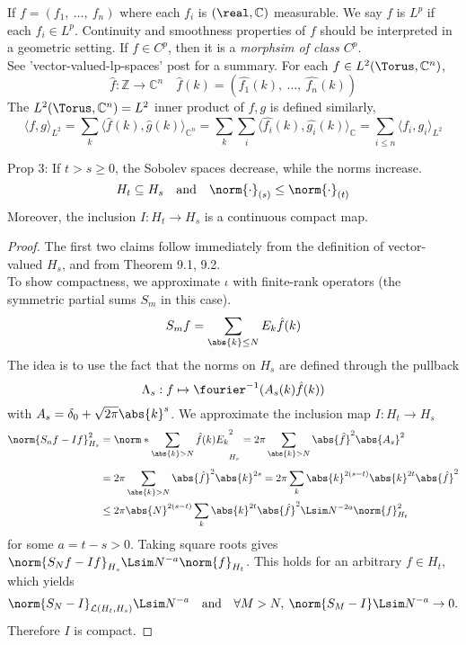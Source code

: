 \documentclass[../main-v2-manifolds.tex]{subfiles}
\begin{document}
If $f = (f_1,\: \ldots, \: f_n)$ where each $f_i$ is $(\real,\mathbb{C})$ measurable. We say $f$ is $L^p$ if each $f_i\in L^p$. Continuity and smoothness properties of $f$ should be interpreted in a geometric setting. If $f\in C^p$, then it is a \emph{morphsim of class $C^p$}.\\
See 'vector-valued-lp-spaces' post for a summary.
For each $f\in L^2(\Torus, \mathbb{C}^n)$, 
\[
\hat{f}:\mathbb{Z}\to\mathbb{C}^n\quad \hat{f}(k) = (\hat{f_1}(k),\:\ldots,\:\hat{f_n}(k))
\]
The $L^2(\Torus,\mathbb{C}^n)=L^2$ inner product of $f,g$ is defined similarly,
\[
\langle f,g\rangle_{L^2} = \sum_k \langle \hat{f}(k),\hat{g}(k)\rangle_{\mathbb{C}^n} =\sum_k\sum_i\langle\hat{f_i}(k),\hat{g_i} (k)\rangle_{\mathbb{C}} =\sum_{i\leq n}\langle f_i,g_i\rangle_{L^2}
\]
\begin{wts}
Prop 3: If $t>s\geq 0$, the Sobolev spaces decrease, while the norms increase.
\[
H_t\subseteq H_s\quad\text{and}\quad \norm{\cdot}_{(s)}\leq\norm{\cdot}_{(t)}
\]
Moreover, the inclusion $I: H_t\to H_s$ is a continuous compact map.
\end{wts}
\begin{proof}
The first two claims follow immediately from the definition of vector-valued $H_s$, and from Theorem 9.1, 9.2.\\

To show compactness, we approximate $\iota$ with finite-rank operators (the symmetric partial sums $S_m$ in this case).
\[
S_m f = \sum_{\abs{k} \leq N} E_k\hat{f}(k)
\]
The idea is to use the fact that the norms on $H_s$ are defined through the pullback
\[
\Lambda_s: f\mapsto \fourier^{-1}(A_s(k)\hat{f}(k))
\]
with $A_s = \delta_0 + \sqrt{2\pi}\abs{k}^{s}$. We approximate the inclusion map $I: H_t\to H_s$
\begin{align*}
\norm{S_n f - If}_{H_s}^{2} &= \norm*{\sum_{\abs{k} > N}\hat{f}(k)E_k }_{H_s}^{2}=2\pi\sum_{{\abs{k}> N}}\abs{\hat{f}}^2\abs{A_s}^2\\[1ex]
&=2\pi\sum_{\abs{k}> N}\abs{\hat{f}}^2\abs{k}^{2s}=2\pi\sum_{k}\abs{k}^{2(s-t)} \abs{k}^{2t}\abs{\hat{f}}^2\\
&\leq 2\pi\abs{N}^{2(s-t)}\sum_{k}\abs{k}^{2t}\abs{\hat{f}}^2\Lsim N^{-2a}\norm{f}^2_{H_t}
\end{align*}
for some $a = t-s > 0$. Taking square roots gives $\norm{S_N f - If}_{H_s}\Lsim N^{-a}\norm{f}_{H_t}$. This holds for an arbitrary $f\in H_t$, which yields
\[
\norm{S_N -I}_{\mathcal{L}(H_t, H_s)}\Lsim N^{-a}\quad\text{and}\quad\forall M>N,\: \norm{S_M - I}\Lsim N^{-a}\to 0.
\]
Therefore $I$ is compact.
\end{proof}
\end{document}
